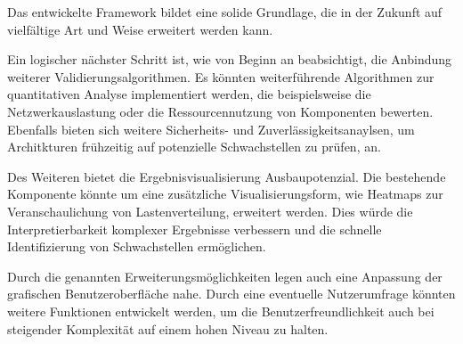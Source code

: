 Das entwickelte Framework bildet eine solide Grundlage, die in der Zukunft auf vielfältige Art und Weise erweitert werden kann.

Ein logischer nächster Schritt ist, wie von Beginn an beabsichtigt, die Anbindung weiterer Validierungsalgorithmen. Es könnten weiterführende Algorithmen zur quantitativen Analyse implementiert werden, die beispielsweise die Netzwerkauslastung oder die Ressourcennutzung von Komponenten bewerten.  Ebenfalls bieten sich weitere Sicherheits- und Zuverlässigkeitsanaylsen, um Architkturen frühzeitig auf potenzielle Schwachstellen zu prüfen, an.

Des Weiteren bietet die Ergebnisvisualisierung Ausbaupotenzial. Die bestehende Komponente könnte um eine zusätzliche Visualisierungsform, wie Heatmaps zur Veranschaulichung von Lastenverteilung, erweitert werden. Dies würde die Interpretierbarkeit komplexer Ergebnisse verbessern und die schnelle Identifizierung von Schwachstellen ermöglichen.

Durch die genannten Erweiterungsmöglichkeiten legen auch eine Anpassung der grafischen Benutzeroberfläche nahe. Durch eine eventuelle Nutzerumfrage könnten weitere Funktionen entwickelt werden, um die Benutzerfreundlichkeit auch bei steigender Komplexität auf einem hohen Niveau zu halten.